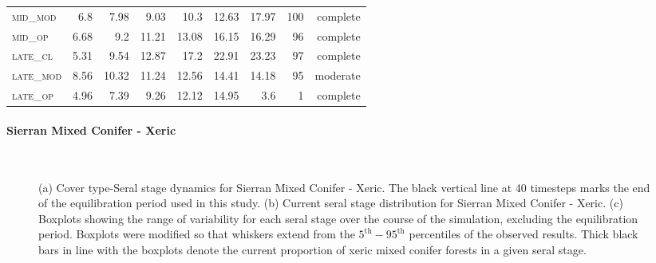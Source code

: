\begin{table}[!htbp]
\begin{tabular}{@{}lrrrrr|rrr@{}}
\textsc{mid\_mod  }        &   6.8         &  7.98    &  9.03      &  10.3    &  12.63     &  17.97    &  100   &  complete     \\
\textsc{mid\_op   }        &   6.68        &  9.2     &  11.21     &  13.08   &  16.15     &  16.29    &  96    &  complete     \\
\textsc{late\_cl  }        &   5.31        &  9.54    &  12.87     &  17.2    &  22.91     &  23.23    &  97    &  complete      \\
\textsc{late\_mod }        &   8.56        &  10.32   &  11.24     &  12.56   &  14.41     &  14.18    &  95    &  moderate      \\
\textsc{late\_op  }        &   4.96        &  7.39    &  9.26      &  12.12   &  14.95     &  3.6      &  1     &  complete      \\
\bottomrule
\end{tabular}
\end{table}





\paragraph*{Sierran Mixed Conifer - Xeric}

\begin{figure}[!htbp]
  \centering
   \\
  \caption{(a) Cover type-Seral stage dynamics for Sierran Mixed Conifer - Xeric. The black vertical line at 40 timesteps marks the end of the equilibration period used in this study. (b) Current seral stage distribution for Sierran Mixed Conifer - Xeric. (c) Boxplots showing the range of variability for each seral stage over the course of the simulation, excluding the equilibration period. Boxplots were modified so that whiskers extend from the $5^{\text{th}} - 95^{\text{th}}$ percentiles of the observed results. Thick black bars in line with the boxplots denote the current proportion of xeric mixed conifer forests in a given seral stage.}  
  \label{fig:hrv-covcond_smcx}
\end{figure}

